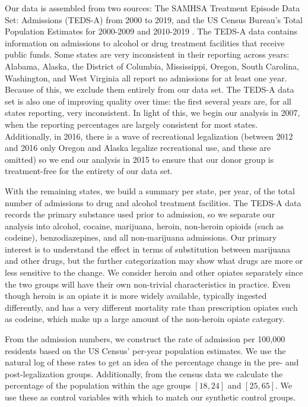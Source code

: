 \documentclass{article}
\begin{document}
Our data is assembled from two sources: The SAMHSA Treatment Episode Data Set: Admissions (TEDS-A) \citep{TEDS} from 2000 to 2019, and the US Census Bureau's Total Population Estimates for 2000-2009 \citep{USCen09} and 2010-2019 \citep{USCen19}. The TEDS-A data contains information on admissions to alcohol or drug treatment facilities that receive public funds. Some states are very inconsistent in their reporting across years:  Alabama, Alaska, the District of Columbia,  Mississippi, Oregon, South Carolina, Washington, and West Virginia all report no admissions for at least one year. Because of this, we exclude them entirely from our data set. The TEDS-A data set is also one of improving quality over time: the first several years are, for all states reporting, very inconsistent. In light of this, we begin our analysis in 2007, when the reporting percentages are largely consistent for most states. Additionally, in 2016, there is a wave of recreational legalization (between 2012 and 2016 only Oregon and Alaska legalize recreational use, and these are omitted) so we end our analysis in 2015 to ensure that our donor group is treatment-free for the entirety of our data set.

With the remaining states, we build a summary per state, per year, of the total number of admissions to drug and alcohol treatment facilities. The TEDS-A data records the primary substance used prior to admission, so we separate our analysis into alcohol, cocaine, marijuana, heroin, non-heroin opioids (such as codeine), benzodiazepines, and all non-marijuana admissions. Our primary interest is to understand the effect in terms of substitution between marijuana and other drugs, but the further categorization may show what drugs are more or less sensitive to the change. We consider heroin and other opiates separately since the two groups will have their own non-trivial characteristics in practice. Even though heroin is an opiate it is more widely available, typically ingested differently, and has a very different mortality rate than prescription opiates such as codeine, which make up a large amount of the non-heroin opiate category.

From the admission numbers, we construct the rate of admission per 100,000 residents based on the US Census' per-year population estimates. We use the natural log of these rates to get an idea of the percentage change in the pre- and post-legalization groups. Additionally, from the census data we calculate the percentage of the population within the age groups $[18, 24]$ and $[25, 65]$. We use these as control variables with which to match our synthetic control groups.
\end{document}
